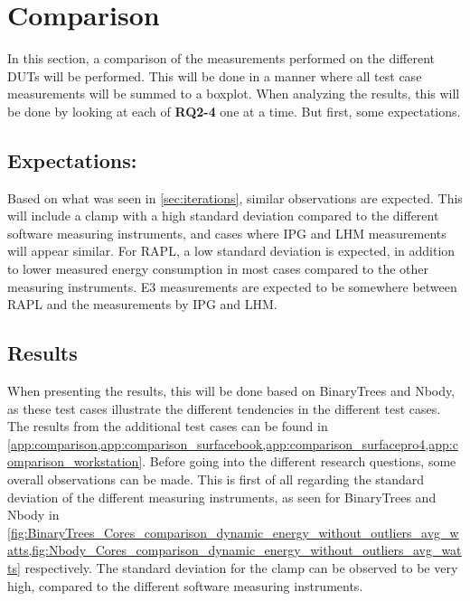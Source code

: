 \section{Comparison}\label{sec:comparison}

In this section, a comparison of the measurements performed on the different DUTs will be performed. This will be done in a manner where all test case measurements will be summed to a boxplot. When analyzing the results, this will be done by looking at each of \textbf{RQ2-4} one at a time. But first, some expectations.


\subsection{Expectations:} 

Based on what was seen in \cref{sec:iterations}, similar observations are expected. This will include a clamp with a high standard deviation compared to the different software measuring instruments, and cases where IPG and LHM measurements will appear similar. For RAPL, a low standard deviation is expected, in addition to lower measured energy consumption in most cases compared to the other measuring instruments. E3 measurements are expected to be somewhere between RAPL and the measurements by IPG and LHM.


\subsection{Results}

When presenting the results, this will be done based on BinaryTrees and Nbody, as these test cases illustrate the different tendencies in the different test cases. The results from the additional test cases can be found in \cref*{app:comparison,app:comparison_surfacebook,app:comparison_surfacepro4,app:comparison_workstation}. Before going into the different research questions, some overall observations can be made. This is first of all regarding the standard deviation of the different measuring instruments, as seen for BinaryTrees and Nbody in \cref*{fig:BinaryTrees_Cores_comparison_dynamic_energy_without_outliers_avg_watts,fig:Nbody_Cores_comparison_dynamic_energy_without_outliers_avg_watts} respectively. The standard deviation for the clamp can be observed to be very high, compared to the different software measuring instruments.






